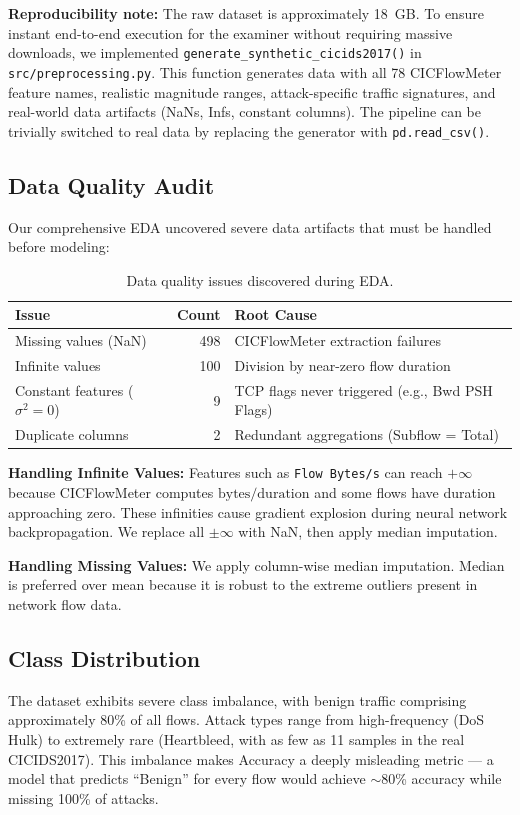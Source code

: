 \documentclass[11pt,a4paper]{article}
\begin{document}
\textbf{Reproducibility note:} The raw dataset is approximately 18~GB. To ensure instant end-to-end execution for the examiner without requiring massive downloads, we implemented \texttt{generate\_synthetic\_cicids2017()} in \texttt{src/preprocessing.py}. This function generates data with all 78 CICFlowMeter feature names, realistic magnitude ranges, attack-specific traffic signatures, and real-world data artifacts (NaNs, Infs, constant columns). The pipeline can be trivially switched to real data by replacing the generator with \texttt{pd.read\_csv()}.

\subsection{Data Quality Audit}
Our comprehensive EDA uncovered severe data artifacts that must be handled before modeling:

\begin{table}[H]
\centering
\begin{tabular}{lrl}
\toprule
\textbf{Issue} & \textbf{Count} & \textbf{Root Cause} \\
\midrule
Missing values (NaN) & 498 & CICFlowMeter extraction failures \\
Infinite values & 100 & Division by near-zero flow duration \\
Constant features ($\sigma^2 = 0$) & 9 & TCP flags never triggered (e.g., Bwd PSH Flags) \\
Duplicate columns & 2 & Redundant aggregations (Subflow = Total) \\
\bottomrule
\end{tabular}
\caption{Data quality issues discovered during EDA.}
\end{table}

\textbf{Handling Infinite Values:} Features such as \texttt{Flow Bytes/s} can reach $+\infty$ because CICFlowMeter computes $\text{bytes}/\text{duration}$ and some flows have duration approaching zero. These infinities cause gradient explosion during neural network backpropagation. We replace all $\pm\infty$ with NaN, then apply median imputation.

\textbf{Handling Missing Values:} We apply column-wise median imputation. Median is preferred over mean because it is robust to the extreme outliers present in network flow data.

\subsection{Class Distribution}
The dataset exhibits severe class imbalance, with benign traffic comprising approximately 80\% of all flows. Attack types range from high-frequency (DoS Hulk) to extremely rare (Heartbleed, with as few as 11 samples in the real CICIDS2017). This imbalance makes Accuracy a deeply misleading metric --- a model that predicts ``Benign'' for every flow would achieve $\sim$80\% accuracy while missing 100\% of attacks.
\end{document}

